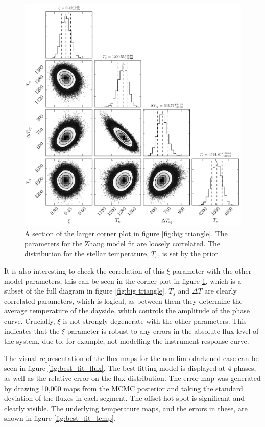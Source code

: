 \documentclass[a4paper,fleqn,usenatbib]{mnras}
\begin{document}
\begin{figure}
\begin{center}
\includegraphics[width=\columnwidth]{img/free_parameterstriangle.pdf}
\caption{A section of the larger corner plot in figure \ref{fig:big triangle}. The parameters for the Zhang model fit are loosely correlated. The distribution for the stellar temperature, $T_s$, is set by the prior}
\label{fig:triangle corner sub}
\end{center}
\end{figure}

It is also interesting to check the correlation of this $\xi$ parameter with the other model parameters, this can be seen in the corner plot in figure \ref{fig:triangle corner sub}, which is a subset of the full diagram in figure \ref{fig:big triangle}. $T_s$ and $\Delta T$ are clearly correlated parameters, which is logical, as between them they determine the average temperature of the dayside, which controls the amplitude of the phase curve. Crucially, $\xi$ is not strongly degenerate with the other parameters. This indicates that the $\xi$ parameter is robust to any errors in the absolute flux level of the system, due to, for example, not modelling the instrument response curve.

The visual representation of the flux maps for the non-limb darkened case can be seen in figure \ref{fig:best_fit_flux}. The best fitting model is displayed at 4 phases, as well as the relative error on the flux distribution. The error map was generated by drawing 10,000 maps from the MCMC posterior and taking the standard deviation of the fluxes in each segment. The offset hot-spot is significant and clearly visible. The underlying temperature maps, and the errors in these, are shown in figure \ref{fig:best_fit_temp}.
\end{document}
